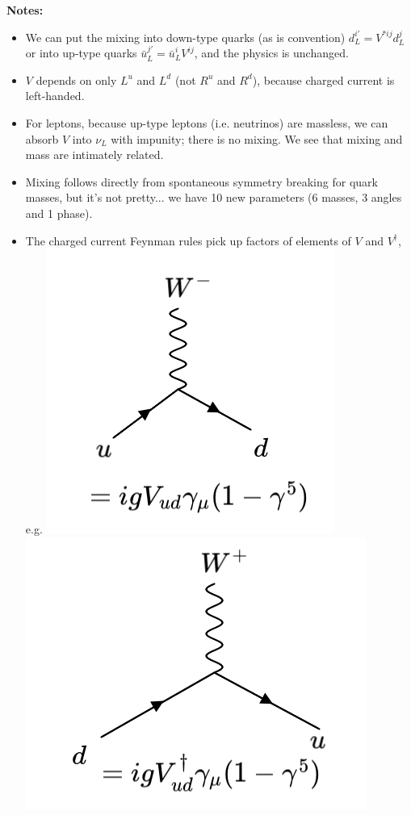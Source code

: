 \textbf{Notes: }
\begin{itemize}
\item We can put the mixing into down-type quarks (as is convention) $d_L^{i \prime} = V^{* ij} d_L^j$ or into up-type quarks $\bar{u}_L^{j \prime} = \bar{u}_L^iV^{ij}$, and the physics is unchanged.
\item $V$ depends on only $L^u$ and $L^d$ (not $R^u$ and $R^d$), because charged current is left-handed.
\item For leptons, because up-type leptons (i.e. neutrinos) are massless, we can absorb $V$ into $\nu_L$ with impunity; there is no mixing. We see that mixing and mass are intimately related.
\item Mixing follows directly from spontaneous symmetry breaking for quark masses, but it's not pretty... we have 10 new parameters (6 masses, 3 angles and 1 phase).
\item The charged current Feynman rules pick up factors of elements of $V$ and $V^\dagger$, e.g.
\newline
\includegraphics[width=0.4\linewidth]{figs/46a.png}
\includegraphics[width=0.4\linewidth]{figs/46b.png}
\end{itemize}
%
